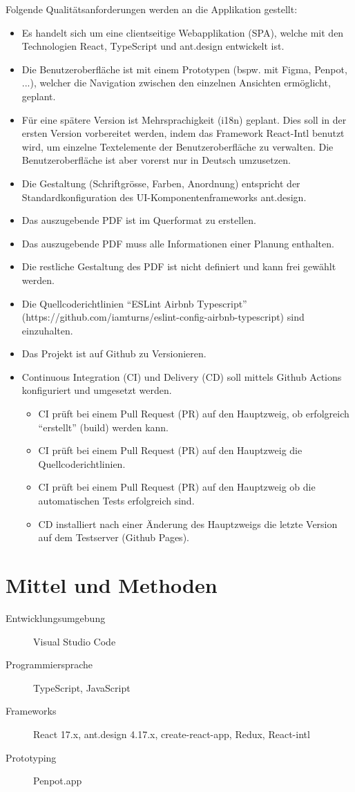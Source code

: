 Folgende Qualitätsanforderungen werden an die Applikation gestellt:
\begin{itemize}
  \item Es handelt sich um eine clientseitige Webapplikation (SPA), welche mit den Technologien React, TypeScript und ant.design entwickelt ist.
  \item Die Benutzeroberfläche ist mit einem Prototypen (bspw. mit Figma, Penpot, ...), welcher die Navigation zwischen den einzelnen Ansichten ermöglicht, geplant.
  \item Für eine spätere Version ist Mehrsprachigkeit (i18n) geplant. Dies soll in der ersten Version vorbereitet werden, indem das Framework React-Intl benutzt wird, um einzelne Textelemente der Benutzeroberfläche zu verwalten. Die Benutzeroberfläche ist aber vorerst nur in Deutsch umzusetzen.
  \item Die Gestaltung (Schriftgrösse, Farben, Anordnung) entspricht der Standardkonfiguration des UI-Komponentenframeworks ant.design.
  \item Das auszugebende PDF ist im Querformat zu erstellen.
  \item Das auszugebende PDF muss alle Informationen einer Planung enthalten.
  \item Die restliche Gestaltung des PDF ist nicht definiert und kann frei gewählt werden.
  \item Die Quellcoderichtlinien \enquote{ESLint Airbnb Typescript} (https://github.com/iamturns/eslint-config-airbnb-typescript) sind einzuhalten.
  \item Das Projekt ist auf Github zu Versionieren.
  \item Continuous Integration (CI) und Delivery (CD) soll mittels Github Actions konfiguriert und umgesetzt werden.
  \begin{itemize}
    \item CI prüft bei einem Pull Request (PR) auf den Hauptzweig, ob erfolgreich \enquote{erstellt} (build) werden kann.
    \item CI prüft bei einem Pull Request (PR) auf den Hauptzweig die Quellcoderichtlinien.
    \item CI prüft bei einem Pull Request (PR) auf den Hauptzweig ob die automatischen Tests erfolgreich sind.
    \item CD installiert nach einer Änderung des Hauptzweigs die letzte Version auf dem Testserver (Github Pages).
  \end{itemize}
\end{itemize}

\section{Mittel und Methoden}

\begin{description}
  \item[Entwicklungsumgebung] Visual Studio Code
  \item[Programmiersprache] TypeScript, JavaScript
  \item[Frameworks] React 17.x, ant.design 4.17.x, create-react-app, Redux, React-intl
  \item[Prototyping] Penpot.app
\end{description}